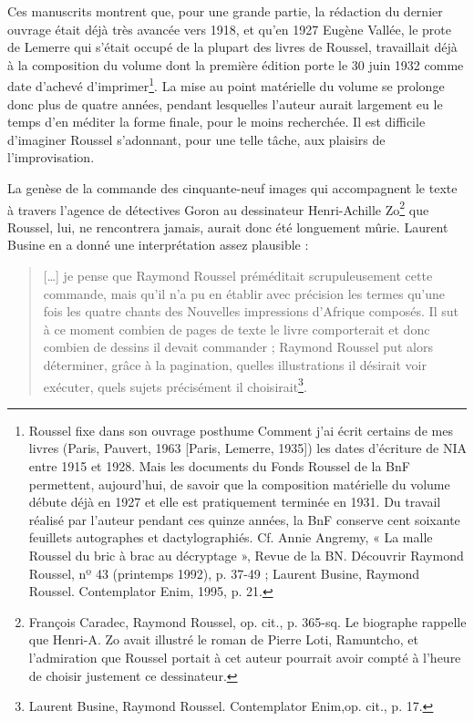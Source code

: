\documentclass[nofonts]{tufte-handout}
\begin{document}
Ces manuscrits montrent que, pour une grande partie, la rédaction du dernier ouvrage était déjà très avancée vers 1918, et qu’en 1927 Eugène Vallée, le prote de Lemerre qui s’était occupé de la plupart des livres de Roussel, travaillait déjà à la composition du volume dont la première édition porte le 30 juin 1932 comme date d’achevé d’imprimer\footnote{Roussel fixe dans son ouvrage posthume Comment j’ai écrit certains de mes livres (Paris, Pauvert, 1963 [Paris, Lemerre, 1935]) les dates d’écriture de NIA entre 1915 et 1928. Mais les documents du Fonds Roussel de la BnF permettent, aujourd’hui, de savoir que la composition matérielle du volume débute déjà en 1927 et elle est pratiquement terminée en 1931. Du travail réalisé par l’auteur pendant ces quinze années, la BnF conserve cent soixante feuillets autographes et dactylographiés. Cf. Annie Angremy, « La malle Roussel du bric à brac au décryptage », Revue de la BN. Découvrir Raymond Roussel, nº 43 (printemps 1992), p. 37-49 ; Laurent Busine, Raymond Roussel. Contemplator Enim, 1995, p. 21.}. La mise au point matérielle du volume se prolonge donc plus de quatre années, pendant lesquelles l’auteur aurait largement eu le temps d’en méditer la forme finale, pour le moins recherchée. Il est difficile d’imaginer Roussel s’adonnant, pour une telle tâche, aux plaisirs de l’improvisation.


La genèse de la commande des cinquante-neuf images qui accompagnent le texte à travers l’agence de détectives Goron au dessinateur Henri-Achille Zo\footnote{François Caradec, Raymond Roussel, op. cit., p. 365-sq. Le biographe rappelle que Henri-A. Zo avait illustré le roman de Pierre Loti, Ramuntcho, et l’admiration que Roussel portait à cet auteur pourrait avoir compté à l’heure de choisir justement ce dessinateur.} que Roussel, lui, ne rencontrera jamais, aurait donc été longuement mûrie. Laurent Busine en a donné une interprétation assez plausible :

\begin{quote}
[\ldots{}] je pense que Raymond Roussel préméditait scrupuleusement cette commande, mais qu’il n’a pu en établir avec précision les termes qu’une fois les quatre chants des Nouvelles impressions d’Afrique composés. Il sut à ce moment combien de pages de texte le livre comporterait et donc combien de dessins il devait commander ; Raymond Roussel put alors déterminer, grâce à la pagination, quelles illustrations il désirait voir exécuter, quels sujets précisément il choisirait\footnote{Laurent Busine, Raymond Roussel. Contemplator Enim,op. cit., p. 17.}.
\end{quote}
\end{document}

